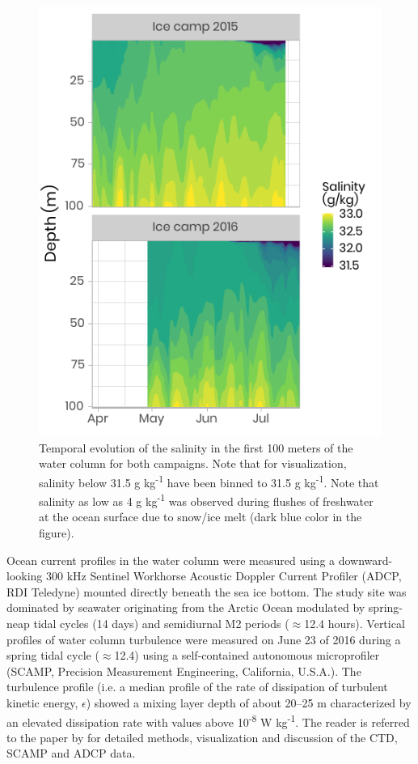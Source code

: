 \documentclass[essd, manuscript]{copernicus}
\begin{document}
\begin{figure}[H]
	\centering
	\includegraphics[scale = 1]{../../../graphs/fig03.pdf}
	\caption{Temporal evolution of the salinity in the first 100 meters of the water column for both campaigns. Note that for visualization, salinity below 31.5 g kg\textsuperscript{-1} have been binned to 31.5 g kg\textsuperscript{-1}. Note that salinity as low as 4 g kg\textsuperscript{-1} was observed during flushes of freshwater at the ocean surface due to snow/ice melt (dark blue color in the figure).}
\end{figure}

Ocean current profiles in the water column were measured using a downward-looking 300 kHz Sentinel Workhorse Acoustic Doppler Current Profiler (ADCP, RDI Teledyne) mounted directly beneath the sea ice bottom. The study site was dominated by seawater originating from the Arctic Ocean modulated by spring-neap tidal cycles (14 days) and semidiurnal M2 periods ($\approx$12.4 hours). Vertical profiles of water column turbulence were measured on June 23 of 2016 during a spring tidal cycle ($\approx$12.4) using a self-contained autonomous microprofiler (SCAMP, Precision Measurement Engineering, California, U.S.A.). The turbulence profile (i.e. a median profile of the rate of dissipation of turbulent kinetic energy, $\epsilon$) showed a mixing layer depth of about 20–25 m characterized by an elevated dissipation rate with values above 10\textsuperscript{-8} W kg\textsuperscript{-1}. The reader is referred to the paper by \citet{Oziel2019} for detailed methods, visualization and discussion of the CTD, SCAMP and ADCP data. 
\end{document}
